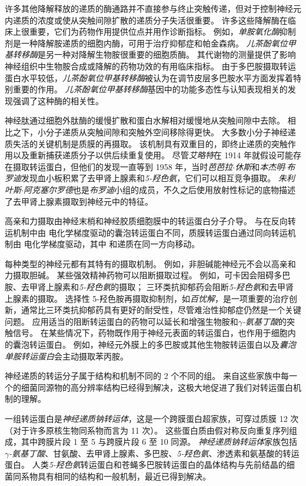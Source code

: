 许多其他降解释放的递质的酶通路并不直接参与终止突触传递，但对于控制神经元内递质的浓度或使从突触间隙扩散的递质分子失活很重要。
许多这些降解酶在临床上很重要，它们为药物作用提供位点并用作诊断指标。
例如，\textit{单胺氧化酶}抑制剂是一种降解胺递质的细胞内酶，可用于治疗抑郁症和帕金森病。
\textit{儿茶酚氧位甲基转移酶}是另一种对降解生物胺很重要的细胞质酶。
其代谢物的测量提供了影响神经组织中生物胺合成或降解的药物功效的有用临床指标。
由于多巴胺摄取转运蛋白水平较低，\textit{儿茶酚氧位甲基转移酶}被认为在调节皮层多巴胺水平方面发挥着特别重要的作用。
\textit{儿茶酚氧位甲基转移酶}基因中的功能多态性与认知表现相关的发现强调了这种酶的相关性。


神经肽通过细胞外肽酶的缓慢扩散和蛋白水解相对缓慢地从突触间隙中去除。
相比之下，小分子递质从突触间隙和突触外空间移除得更快。
大多数小分子神经递质失活的关键机制是质膜的再摄取。 
该机制具有双重目的，即终止递质的突触作用以及重新捕获递质分子以供后续重复使用。
尽管\textit{艾略特}在 1914 年就假设可能存在摄取转运蛋白，但他们的发现一直等到 1958 年，当时\textit{芭芭拉$\cdot$休斯}和\textit{本杰明$\cdot$布罗迪}发现血小板积累了去甲肾上腺素和\textit{5-羟色氨}，它们可以相互竞争摄取。
\textit{朱利叶斯$\cdot$阿克塞尔罗德}也是\textit{布罗迪}小组的成员，不久之后使用放射性标记的底物描述了去甲肾上腺素摄取到神经元中的特征。


高亲和力摄取由神经末梢和神经胶质细胞膜中的转运蛋白分子介导。
与在反向转运机制中由  电化学梯度驱动的囊泡转运蛋白不同，质膜转运蛋白通过同向转运机制由  电化学梯度驱动，其中  和递质在同一方向移动。


每种类型的神经元都有其特有的摄取机制。
例如，非胆碱能神经元不会以高亲和力摄取胆碱。
某些强效精神药物可以阻断摄取过程。
例如，可卡因会阻碍多巴胺、去甲肾上腺素和\textit{5-羟色氨}的摄取；
三环类抗抑郁药会阻断\textit{5-羟色氨}和去甲肾上腺素的摄取。
选择性 5-羟色胺再摄取抑制剂，如\textit{百忧解}，是一项重要的治疗创新，通常比三环类抗抑郁药具有更好的耐受性，尽管难治性抑郁症仍然是一个关键问题。
应用适当的阻断转运蛋白的药物可以延长和增强生物胺和\textit{$\gamma$-氨基丁酸}的突触信号。
在某些情况下，药物既作用于神经元表面的转运蛋白，也作用于细胞内的囊泡转运蛋白。
例如，神经元外膜上的多巴胺或其他生物胺转运蛋白以及\textit{囊泡单胺转运蛋白}会主动摄取苯丙胺。


神经递质的转运分子属于结构和机制不同的 2 个不同的组。
来自这些家族中每一个的细菌同源物的高分辨率结构已经得到解决，这极大地促进了我们对转运蛋白机制的理解。


一组转运蛋白是\textit{神经递质钠转运体}，这是一个跨膜蛋白超家族，可穿过质膜 12 次（对于许多原核生物同系物而言为 11 次）。
这些蛋白质由假对称反向重复序列组成，其中跨膜片段 1 至 5 与跨膜片段 6 至 10 同源。
\textit{神经递质钠转运体}家族包括\textit{$\gamma$-氨基丁酸}、甘氨酸、去甲肾上腺素、多巴胺、\textit{5-羟色氨}、渗透素和氨基酸的转运蛋白。
人类\textit{5-羟色氨}转运蛋白和苍蝇多巴胺转运蛋白的晶体结构与先前结晶的细菌同系物具有相同的结构和一般机制，最近已得到解决。


